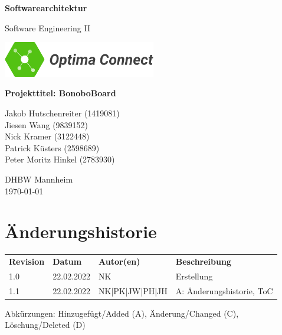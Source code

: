 \documentclass[a4paper,11pt]{scrartcl}
\begin{document}
\renewcommand*{\arraystretch}{1.2}
\begin{titlepage}
    \begin{center}
        \vspace*{1cm}\Huge
        \textbf{Softwarearchitektur}\par
        \vspace{0.5cm}\LARGE        
        Software Engineering II\par           
        \vspace{2cm}
        \includegraphics[width=0.5\textwidth]{OptimaLogo_long}\par   
        \vspace{1cm}
        \textbf{Projekttitel: BonoboBoard}\par        
        \vfill\Large   
        Jakob Hutschenreiter (1419081)\\Jiesen Wang (9839152)\\Nick Kramer (3122448)\\Patrick Küsters (2598689)\\Peter Moritz Hinkel (2783930)\par
        \vspace{2cm}
        DHBW Mannheim\\
        \today     
    \end{center}
\end{titlepage}

\section*{Änderungshistorie}
\begin{table}[h]
	\begin{tabular}{@{} p{20mm} p{25mm} p{25mm} p{75mm}}
		\textbf{Revision} & \textbf{Datum} & \textbf{Autor(en)} & \textbf{Beschreibung}\\
		1.0 & 22.02.2022 & NK & Erstellung\\
		1.1 & 22.02.2022 & NK|PK|JW|PH|JH & A: Änderungshistorie, ToC\\
	\end{tabular}
\end{table}
\noindent
Abkürzungen: Hinzugefügt/Added (A), Änderung/Changed (C), Löschung/Deleted (D)
\vspace{2cm}
\tableofcontents
\newpage
{}
\end{document}
